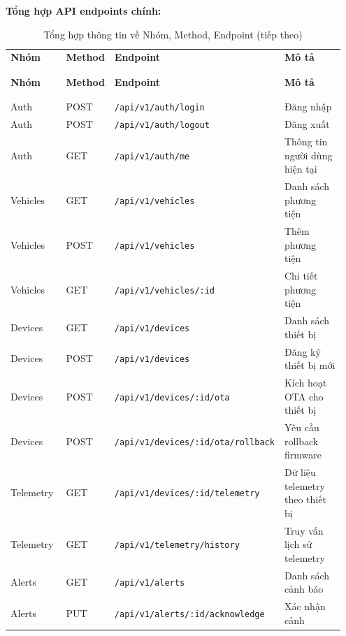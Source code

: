 \documentclass[a4paper]{extarticle}
\newcommand{\thesissettableid}[2]{%
  \renewcommand{\thetable}{#1}%
  \renewcommand{\theHtable}{#2}%
}
\begin{document}
\textbf{Tổng hợp API endpoints chính:}


{\thesissettableid{4.3A}{tab-ch4-tong-hop-thong-tin-ve-nhom-method-endpoint}
\def\LTcaptype{table}
\begin{longtable}{|L{0.226\linewidth}|L{0.137\linewidth}|L{0.204\linewidth}|L{0.387\linewidth}|}
\caption{Tổng hợp thông tin về Nhóm, Method, Endpoint}\label{tab:ch4-tong-hop-thong-tin-ve-nhom-method-endpoint}\\
\hline \textbf{Nhóm} & \textbf{Method} & \textbf{Endpoint} & \textbf{Mô tả} \\
\\\hline
\endfirsthead
\caption[]{Tổng hợp thông tin về Nhóm, Method, Endpoint (tiếp theo)}\\
\hline \textbf{Nhóm} & \textbf{Method} & \textbf{Endpoint} & \textbf{Mô tả} \\
\\\hline
\endhead
\\\hline
\endfoot
\endlastfoot
Auth & POST & \nolinkurl{/api/v1/auth/login} & Đăng nhập \\\hline
Auth & POST & \nolinkurl{/api/v1/auth/logout} & Đăng xuất \\\hline
Auth & GET & \nolinkurl{/api/v1/auth/me} & Thông tin người dùng hiện tại \\\hline
Vehicles & GET & \nolinkurl{/api/v1/vehicles} & Danh sách phương tiện \\\hline
Vehicles & POST & \nolinkurl{/api/v1/vehicles} & Thêm phương tiện \\\hline
Vehicles & GET & \nolinkurl{/api/v1/vehicles/:id} & Chi tiết phương tiện \\\hline
Devices & GET & \nolinkurl{/api/v1/devices} & Danh sách thiết bị \\\hline
Devices & POST & \nolinkurl{/api/v1/devices} & Đăng ký thiết bị mới \\\hline
Devices & POST & \nolinkurl{/api/v1/devices/:id/ota} & Kích hoạt OTA cho
thiết bị \\\hline
Devices & POST & \nolinkurl{/api/v1/devices/:id/ota/rollback} & Yêu cầu
rollback firmware \\\hline
Telemetry & GET & \nolinkurl{/api/v1/devices/:id/telemetry} & Dữ liệu
telemetry theo thiết bị \\\hline
Telemetry & GET & \nolinkurl{/api/v1/telemetry/history} & Truy vấn lịch sử
telemetry \\\hline
Alerts & GET & \nolinkurl{/api/v1/alerts} & Danh sách cảnh báo \\\hline
Alerts & PUT & \nolinkurl{/api/v1/alerts/:id/acknowledge} & Xác nhận cảnh

\end{longtable}}
\end{document}
